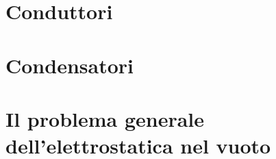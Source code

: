 \section{Conduttori}


\section{Condensatori}


\section{Il problema generale dell'elettrostatica nel vuoto}

